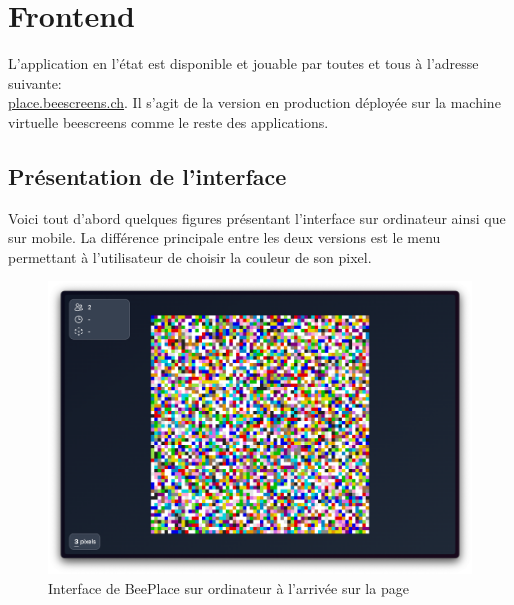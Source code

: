 \section{Frontend}

L'application en l'état est disponible et jouable par toutes et tous à l'adresse suivante: \\ \href{https://place.beescreens.ch}{place.beescreens.ch}. Il s'agit de la version en production déployée sur la machine virtuelle \gls{beescreens} comme le reste des applications.

\subsection{Présentation de l'interface}

Voici tout d'abord quelques figures présentant l'interface sur ordinateur ainsi que sur mobile. La différence principale entre les deux versions est le menu permettant à l'utilisateur de choisir la couleur de son pixel.


\begin{figure}[H]
  \centering
  \includegraphics[width=1\textwidth]{./assets/figures/screenshot-app-v2-1.png}
  \caption{Interface de BeePlace sur ordinateur à l'arrivée sur la page}
  \label{fig:screenshot-app-1}
\end{figure}

